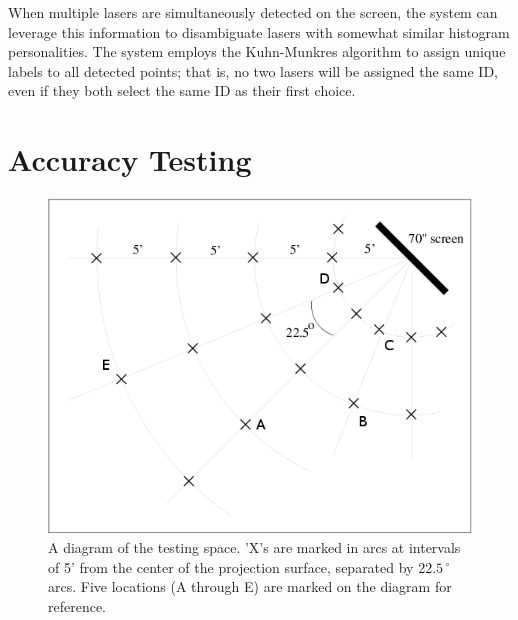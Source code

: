 

When multiple lasers are simultaneously detected on the screen, the system can
leverage this information to disambiguate lasers with somewhat similar
histogram personalities.  The system employs the Kuhn-Munkres algorithm to
assign unique labels to all detected points; that is, no two lasers
will be assigned the same ID, even if they both select the same ID as
their first choice.



\section{Accuracy Testing}
\label{section:TestResults}

\begin{figure}
  \centering
  \includegraphics[width=0.99\linewidth]{images/room_diagram_annotated.png}
  \caption[A diagram of the laser personality testing space]{\label{figure:laser_testing_room_diagram} A diagram of the testing space. 'X's are marked in arcs at intervals of 5' from the center of the projection surface, separated by $22.5\,^{\circ}$ arcs. Five locations (A through E) are marked on the diagram for reference. }
\end{figure}


